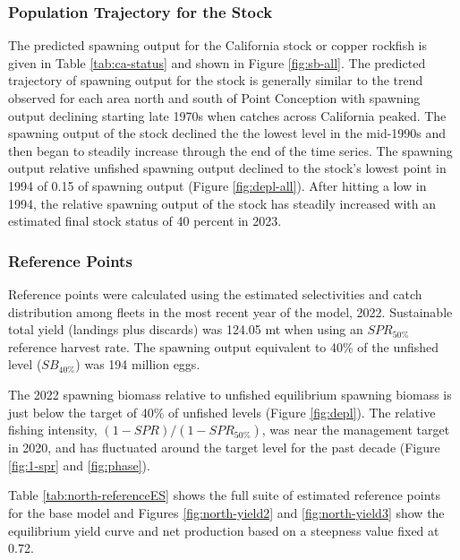 \documentclass[11pt,
  english,
  letterpaper,
]{article}
\begin{document}
\hypertarget{population-trajectory-for-the-stock}{%
\subsubsection{Population Trajectory for the Stock}\label{population-trajectory-for-the-stock}}

The predicted spawning output for the California stock or copper rockfish is given in Table \ref{tab:ca-status} and shown in Figure \ref{fig:sb-all}. The predicted trajectory of spawning output for the stock is generally similar to the trend observed for each area north and south of Point Conception with spawning output declining starting late 1970s when catches across California peaked. The spawning output of the stock declined the the lowest level in the mid-1990s and then began to steadily increase through the end of the time series. The spawning output relative unfished spawning output declined to the stock's lowest point in 1994 of 0.15 of spawning output (Figure \ref{fig:depl-all}). After hitting a low in 1994, the relative spawning output of the stock has steadily increased with an estimated final stock status of 40 percent in 2023.

\hypertarget{reference-points}{%
\subsubsection{Reference Points}\label{reference-points}}

Reference points were calculated using the estimated selectivities and catch distribution among fleets in the most recent year of the model, 2022. Sustainable total yield (landings plus discards) was 124.05 mt when using an \(SPR_{50\%}\) reference harvest rate. The spawning output equivalent to 40\% of the unfished level (\(SB_{40\%}\)) was 194 million eggs.

The 2022 spawning biomass relative to unfished equilibrium spawning biomass is just below the target of 40\% of unfished levels (Figure \ref{fig:depl}). The relative fishing intensity, \((1-SPR)/(1-SPR_{50\%})\), was near the management target in 2020, and has fluctuated around the target level for the past decade (Figure \ref{fig:1-spr} and \ref{fig:phase}).

Table \ref{tab:north-referenceES} shows the full suite of estimated reference points for the base model and Figures \ref{fig:north-yield2} and \ref{fig:north-yield3} show the equilibrium yield curve and net production based on a steepness value fixed at 0.72.
\end{document}
